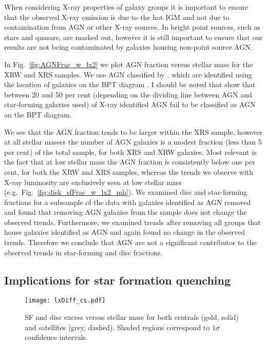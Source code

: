 When considering X-ray properties of galaxy groups it is important to
ensure that the observed X-ray emission is due to the hot IGM and not
due to contamination from AGN or other X-ray sources.  In
\citet{wang2014} bright point sources, such as stars and quasars, are
masked out, however it is still important to ensure that our results
are not being contaminated by galaxies housing non-point source AGN.
\par
In Fig.~\ref{fig:AGNFrac_w_lx2} we plot AGN fraction versus stellar
mass for the XRW and XRS samples.  We use AGN classified by
\citet{kauffmann2003}, which are identified using the location of
galaxies on the BPT diagram \citep{baldwin1981}.  I should be noted
that \citet{trouille2010} show that between 20 and 50 per cent
(depending on the dividing line between AGN and star-forming galaxies
used) of X-ray identified AGN fail to be classified as AGN on the BPT
diagram.
\par
We see that the AGN fraction tends to be larger within the XRS sample,
however at all stellar masses the number of AGN galaxies is a modest
fraction (less than 5 per cent) of the total sample, for both XRS and
XRW galaxies.  Most relevant is the fact that at low stellar mass the
AGN fraction is consistently below one per cent, for both the XRW and
XRS samples, whereas the trends we observe with X-ray luminosity are
exclusively seen at low stellar mass
(e.g.\ Fig.~\ref{fig:disk_sfFrac_w_lx2_mh}).  We examined disc and
star-forming fractions for a subsample of the data with galaxies
identified as AGN removed and found that removing AGN galaxies from
the sample does not change the observed trends.  Furthermore, we
examined trends after removing all groups that house galaxies
identified as AGN and again found no change in the observed trends.
Therefore we conclude that AGN are not a significant contributor to
the observed trends in star-forming and disc fractions.

\subsection{Implications for star formation quenching}

\begin{figure}[!tp]
  \centering
  \texttt{[image: lxDiff\_cs.pdf]}
  \caption[SF and disc excess versus stellar mass for both centrals
    and satellites]{SF and disc excess versus stellar mass for both centrals
    (gold, solid) and satellites (grey, dashed).  Shaded regions
    correspond to $1\sigma$ confidence intervals.}
  \label{fig:lxDiff_cs}
\end{figure}

